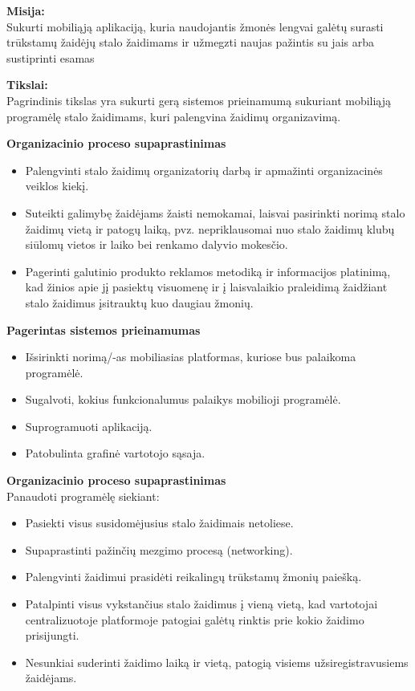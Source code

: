 \documentclass{VUMIFPSkursinis}
\begin{document}
		\textbf{Misija:}\\
		Sukurti mobiliąją aplikaciją, kuria naudojantis žmonės lengvai galėtų 
		surasti trūkstamų žaidėjų stalo žaidimams ir užmegzti naujas pažintis su 
		jais arba sustiprinti esamas

		\textbf{Tikslai:}\\
		Pagrindinis tikslas yra sukurti gerą sistemos prieinamumą sukuriant 
		mobiliąją programėlę stalo žaidimams, kuri palengvina žaidimų organizavimą.

			\textbf{Organizacinio proceso supaprastinimas}
			\renewcommand{\labelitemi}{$\bullet$}
				\begin{itemize}
					\item Palengvinti stalo žaidimų organizatorių darbą ir apmažinti organizacinės veiklos kiekį.
					\item Suteikti galimybę žaidėjams žaisti nemokamai, laisvai pasirinkti norimą stalo žaidimų vietą ir patogų laiką, pvz. nepriklausomai nuo stalo žaidimų klubų siūlomų vietos ir laiko bei renkamo dalyvio mokesčio.
					\item Pagerinti galutinio produkto reklamos metodiką ir informacijos platinimą, kad žinios apie jį pasiektų visuomenę ir į laisvalaikio praleidimą žaidžiant stalo žaidimus įsitrauktų kuo daugiau žmonių.
				\end{itemize}	

			\textbf{Pagerintas sistemos prieinamumas}
			\renewcommand{\labelitemi}{$\bullet$}
				\begin{itemize}
					\item Išsirinkti norimą/-as mobiliasias platformas, kuriose bus palaikoma programėlė.
					\item Sugalvoti, kokius funkcionalumus palaikys mobilioji programėlė.
					\item Suprogramuoti aplikaciją.
					\item Patobulinta grafinė vartotojo sąsaja.
				\end{itemize}	

			\textbf{Organizacinio proceso supaprastinimas}\\
			Panaudoti programėlę siekiant:
			\renewcommand{\labelitemi}{$\bullet$}
				\begin{itemize}
					\item Pasiekti visus susidomėjusius stalo žaidimais netoliese.
					\item Supaprastinti pažinčių mezgimo procesą (networking).
					\item Palengvinti žaidimui prasidėti reikalingų trūkstamų žmonių paiešką.
					\item Patalpinti visus vykstančius stalo žaidimus į vieną vietą, kad vartotojai centralizuotoje platformoje patogiai galėtų rinktis prie kokio žaidimo prisijungti.
					\item Nesunkiai suderinti žaidimo laiką ir vietą, patogią visiems užsiregistravusiems žaidėjams.
				\end{itemize}	
\end{document}
